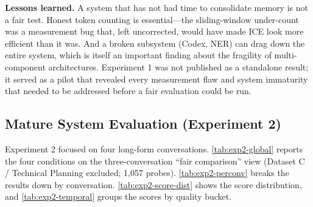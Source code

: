 \documentclass[11pt,a4paper]{article}
\begin{document}
\textbf{Lessons learned.} A system that has not had time to consolidate memory is not a fair test. Honest token counting is essential---the sliding-window under-count was a measurement bug that, left uncorrected, would have made ICE look more efficient than it was. And a broken subsystem (Codex, NER) can drag down the entire system, which is itself an important finding about the fragility of multi-component architectures. Experiment 1 was not published as a standalone result; it served as a pilot that revealed every measurement flaw and system immaturity that needed to be addressed before a fair evaluation could be run.

\subsection{Mature System Evaluation (Experiment 2)}
\label{sec:exp2}

Experiment 2 focused on four long-form conversations. \cref{tab:exp2-global} reports the four conditions on the three-conversation ``fair comparison'' view (Dataset C / Technical Planning excluded; 1{,}057 probes). \cref{tab:exp2-perconv} breaks the results down by conversation. \cref{tab:exp2-score-dist} shows the score distribution, and \cref{tab:exp2-temporal} groups the scores by quality bucket.

\begin{table}[htbp]
\centering
\small
\caption{Experiment 2 (Mature System) --- Global comparison, ICE-Dev excluded (1,057 probes across 3 conversations). On the three conversations where both systems could actually generate usable answers, ICE essentially ties the vector baseline on mean score (4.26 vs 4.25), injects 32\% fewer fragments, and wins 30.6\% of head-to-head comparisons (vs 21.2\%).}
\label{tab:exp2-global}
\end{table}
\end{document}
